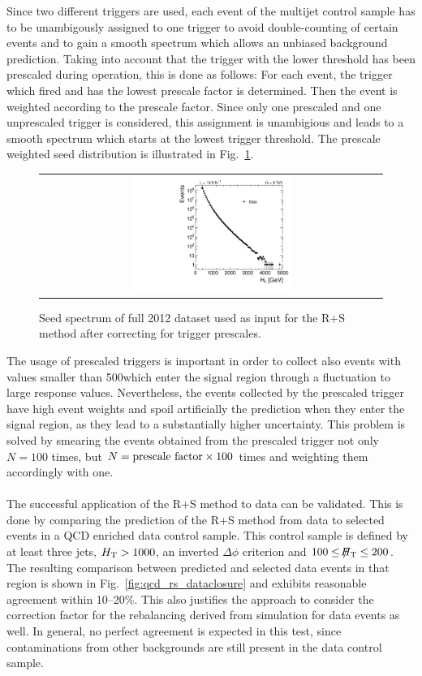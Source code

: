 Since two different triggers are used, each event of the multijet control sample has to be unambigously assigned to one trigger to avoid double-counting of certain events and to gain a smooth \HT spectrum which allows an unbiased background prediction. Taking into account that the trigger with the lower \HT threshold has been prescaled during operation, this is done as follows: For each event, the trigger which fired and has the lowest prescale factor is determined. Then the event is weighted according to the prescale factor. Since only one prescaled and one unprescaled trigger is considered, this assignment is unambigious and leads to a smooth \HT spectrum which starts at the lowest trigger threshold. The prescale weighted seed \HT distribution is illustrated in Fig.~\ref{fig:qcd_rs_seedht}.
\begin{figure}[!t]
  \centering
  \begin{tabular}{c}
                \includegraphics[width=0.49\textwidth]{figures/HT_data.pdf}
  \end{tabular}
  \caption{Seed \HT spectrum of full 2012 dataset used as input for the R+S method after correcting for trigger prescales.}
  \label{fig:qcd_rs_seedht}
\end{figure}
The usage of prescaled triggers is important in order to collect also events with \HT values smaller than 500\gev which enter the signal region through a fluctuation to large response values. Nevertheless, the events collected by the prescaled trigger have high event weights and spoil artificially the prediction when they enter the signal region, as they lead to a substantially higher uncertainty. This problem is solved by smearing the events obtained from the prescaled trigger not only $N = 100$ times, but $N = \rm{prescale~factor} \times 100$ times and weighting them accordingly with one.\\
\\
The successful application of the R+S method to data can be validated. This is done by comparing the prediction of the R+S method from data to selected events in a QCD enriched data control sample. This control sample is defined by at least three jets, $H_{\text{T}} > 1000$\gev, an inverted $\Delta \phi$ criterion and $100 \leq \slash\mkern-12mu{H}_{\text{T}} \leq 200$\gev. The resulting comparison between predicted and selected data events in that region is shown in Fig.~\ref{fig:qcd_rs_dataclosure} and exhibits reasonable agreement within 10--20\%. This also justifies the approach to consider the correction factor for the rebalancing derived from simulation for data events as well. In general, no perfect agreement is expected in this test, since contaminations from other backgrounds are still present in the data control sample. \\
